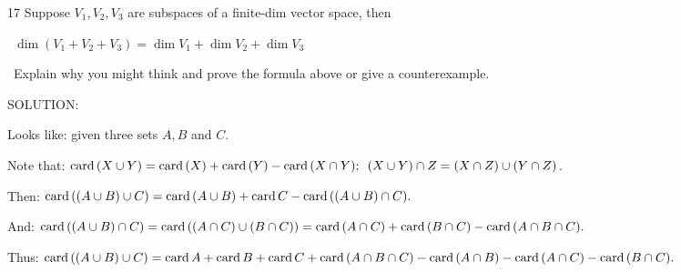 \documentclass[a4paper, 11pt, UTF8]{article}
\def\card{\textup{card}\,}
\begin{document}
\begin{large}
{\timesbf\Large 17} {\timessl\Large 
Suppose $V_1,V_2,V_3$ are subspaces of a finite-dim vector space, then}\par\quad\,
$\dim(V_1+V_2+V_3)=\dim V_1+\dim V_2+\dim V_3$\par{}\quad\,
{\timessl\Large Explain why you might think and prove the formula above or give a counterexample.}\par
{\timesbf S\footnotesize{OLUTION:}}\par
{\timessl Looks like:} given three sets $A,B$ and $C$.\par
{\timessl Note that:} $\card(X\cup Y)=\card(X)+\card(Y)-\card(X\cap Y);\,\,\,(X\cup Y)\cap Z=(X\cap Z)\cup(Y\cap Z)$.\par
{\timessl Then:} $\card((A\cup B)\cup C)=\card(A\cup B)+\card C-\card((A\cup B)\cap C).$\par
{\timessl And:} $\card((A\cup B)\cap C)=\card((A\cap C)\cup(B\cap C))=\card(A\cap C)+\card(B\cap C)-\card(A\cap B\cap C).$\par
{\timessl Thus:} $\card((A\cup B)\cup C)=\card A+\card B+\card C+\card(A\cap B\cap C)-\card(A\cap B)-\card(A\cap C)-\card(B\cap C).$\par


\end{large}
\end{document}
